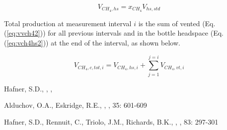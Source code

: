 \documentclass[]{article}
\begin{document}
\begin{equation}
  \label{eq:vch4hs2}
  V_{CH_4,hs} = x_{CH_4} V_{hs,std}
\end{equation}

Total  production at measurement interval $i$ is the sum of vented  (Eq. (\ref{eq:vvch42})) for all previous intervals and  in the bottle headspace (Eq. (\ref{eq:vch4hs2})) at the end of the interval, as shown below.

\begin{equation}
  \label{eq:vch4tot2}
  V_{CH_4,c,tot,i} = V_{CH_4,hs,i} + \sum_{j = 1}^{j = i} {V_{CH_4,vt,i}}
\end{equation}

\begin{thebibliography}{1}

Hafner, S.D.,
    ,
    ,

Alduchov, O.A., Eskridge, R.E.,   
    ,
    , 
     35: 601-609

Hafner, S.D., Rennuit, C., Triolo, J.M., Richards, B.K.,
    ,
    ,
         83: 297-301

\end{thebibliography}
\end{document}
